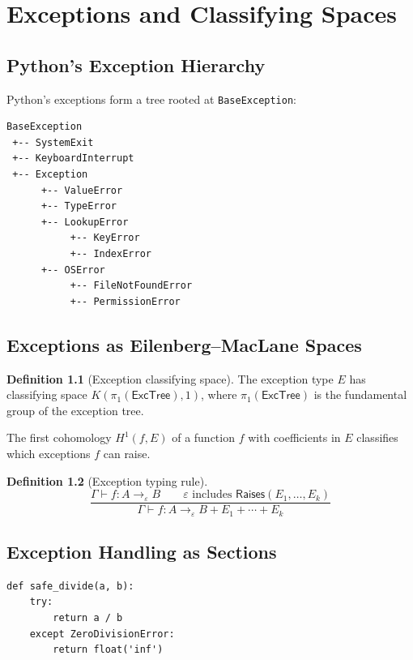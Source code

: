 \documentclass[11pt,a4paper]{report}
\theoremstyle{definition}
\newtheorem{definition}{Definition}[chapter]
\theoremstyle{plain}
\begin{document}
\chapter{Exceptions and Classifying Spaces}
\label{ch:exceptions}

\section{Python's Exception Hierarchy}

Python's exceptions form a tree rooted at \texttt{BaseException}:
\begin{verbatim}
BaseException
 +-- SystemExit
 +-- KeyboardInterrupt
 +-- Exception
      +-- ValueError
      +-- TypeError
      +-- LookupError
           +-- KeyError
           +-- IndexError
      +-- OSError
           +-- FileNotFoundError
           +-- PermissionError
\end{verbatim}

\section{Exceptions as Eilenberg--MacLane Spaces}

\begin{definition}[Exception classifying space]
The exception type $E$ has classifying space $K(\pi_1(\mathsf{ExcTree}), 1)$,
where $\pi_1(\mathsf{ExcTree})$ is the fundamental group of the exception tree.

The first cohomology $H^1(f, E)$ of a function $f$ with coefficients in $E$
classifies which exceptions $f$ can raise.
\end{definition}

\begin{definition}[Exception typing rule]
\[
  \frac{
    \Gamma \vdash f : A \to_{\varepsilon} B \qquad
    \varepsilon \text{ includes } \mathsf{Raises}(E_1, \ldots, E_k)
  }{
    \Gamma \vdash f : A \to_{\varepsilon} B + E_1 + \cdots + E_k
  }
\]
\end{definition}

\section{Exception Handling as Sections}

\begin{lstlisting}[style=python]
def safe_divide(a, b):
    try:
        return a / b
    except ZeroDivisionError:
        return float('inf')
\end{lstlisting}
\end{document}
